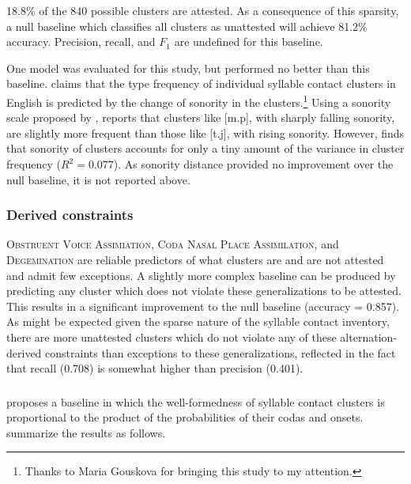 18.8\% of the 840 possible clusters are attested. As a consequence of this sparsity, a null baseline which classifies all clusters as unattested will achieve 81.2\% accuracy. Precision, recall, and $F_1$ are undefined for this baseline.

One model was evaluated for this study, but performed no better than this baseline. \citet{McGowan2011} claims that the type frequency of individual syllable contact clusters in English is predicted by the change of sonority in the clusters.\footnote{Thanks to Maria Gouskova for bringing this study to my attention.} Using a sonority scale proposed by \citet{Jespersen1904}, \citeauthor{McGowan2011} reports that clusters like [m.p], with sharply falling sonority, are slightly more frequent than those like [t.j], with rising sonority. However, \citeauthor{McGowan2011} finds that sonority of clusters accounts for only a tiny amount of the variance in cluster frequency ($R^2 = 0.077$). As sonority distance provided no improvement over the null baseline, it is not reported above.

\subsubsection{Derived constraints}

\textsc{Obstruent Voice Assimiation}, \textsc{Coda Nasal Place Assimilation}, and \textsc{Degemination} are reliable predictors of what clusters are and are not attested and admit few exceptions. A slightly more complex baseline can be produced by predicting any cluster which does not violate these generalizations to be attested. This results in a significant improvement to the null baseline (accuracy = 0.857). As might be expected given the sparse nature of the syllable contact inventory, there are more unattested clusters which do not violate any of these alternation-derived constraints than exceptions to these generalizations, reflected in the fact that recall (0.708) is somewhat higher than precision (0.401). 

\subsubsection{\citet{Pierrehumbert1994}}

\citet{Pierrehumbert1994} proposes a baseline in which the well-formedness of syllable contact clusters is proportional to the product of the probabilities of their codas and onsets. \citeauthor{Coleman1997} summarize the results as follows.

